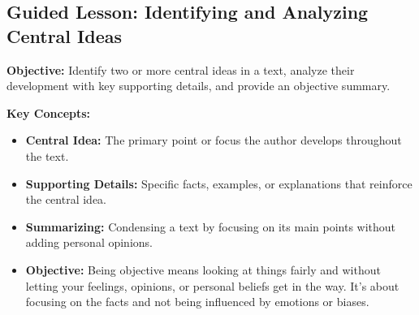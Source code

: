 \documentclass[12pt]{article}
\title{}
\date{}
\begin{document}
\subsection*{Guided Lesson: Identifying and Analyzing Central Ideas}
\onehalfspacing

\begin{tcolorbox}[colframe=black!40, colback=gray!5, 
coltitle=black, colbacktitle=black!20, fonttitle=\bfseries\Large, 
title=Learning Objective, halign title=center, left=5pt, right=5pt, top=5pt, bottom=15pt]
\textbf{Objective:} Identify two or more central ideas in a text, analyze their development with key supporting details, and provide an objective summary.
\end{tcolorbox}

\vspace{1em}

\begin{tcolorbox}[colframe=black!60, colback=white, 
coltitle=black, colbacktitle=black!15, fonttitle=\bfseries\Large, 
title=Key Concepts and Vocabulary, halign title=center, left=10pt, right=10pt, top=10pt, bottom=15pt]
\textbf{Key Concepts:}
\begin{itemize}
    \item \textbf{Central Idea:} The primary point or focus the author develops throughout the text.
    \item \textbf{Supporting Details:} Specific facts, examples, or explanations that reinforce the central idea.
    \item \textbf{Summarizing:} Condensing a text by focusing on its main points without adding personal opinions.
    \item \textbf{Objective:} Being objective means looking at things fairly and without letting your feelings, opinions, or personal beliefs get in the way. It’s about focusing on the facts and not being influenced by emotions or biases. 
\end{itemize}
\end{tcolorbox}

\vspace{1em}
\end{document}
